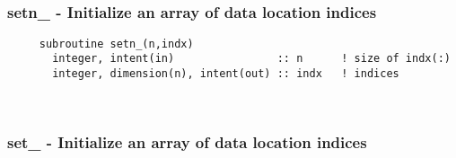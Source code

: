  
 
\mbox{}\hrulefill\ 
 
  \subsubsection{setn\_ - Initialize an array of data location indices}

\begin{verbatim} 
     subroutine setn_(n,indx)
       integer, intent(in)                :: n		! size of indx(:)
       integer, dimension(n), intent(out) :: indx	! indices
 \end{verbatim} %
 
 
\mbox{}\hrulefill\ 
 
  \subsubsection{set\_ - Initialize an array of data location indices}

